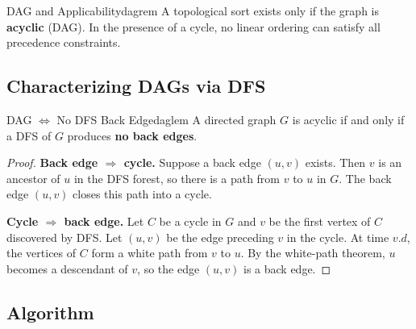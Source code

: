 \begin{remark}{DAG and Applicability}{dagrem}
A topological sort exists only if the graph is \textbf{acyclic} (DAG).
In the presence of a cycle, no linear ordering can satisfy all
precedence constraints.
\end{remark}

\subsection{Characterizing DAGs via DFS}

\begin{theorem}{DAG $\Leftrightarrow$ No DFS Back Edge}{daglem}
A directed graph $G$ is acyclic if and only if a DFS of $G$ produces
\textbf{no back edges}.
\end{theorem}

\begin{proof}
\textbf{Back edge $\Rightarrow$ cycle.}
Suppose a back edge $(u, v)$ exists. Then $v$ is an ancestor of $u$
in the DFS forest, so there is a path from $v$ to $u$ in $G$. The back edge
$(u, v)$ closes this path into a cycle.

\begin{center}
\end{center}

\textbf{Cycle $\Rightarrow$ back edge.}
Let $C$ be a cycle in $G$ and $v$ be the first vertex of $C$ discovered by DFS.
Let $(u, v)$ be the edge preceding $v$ in the cycle. At time $v.d$, the vertices
of $C$ form a white path from $v$ to $u$. By the white-path theorem,
$u$ becomes a descendant of $v$, so the edge $(u, v)$ is a back edge.
\end{proof}

\subsection{Algorithm}

